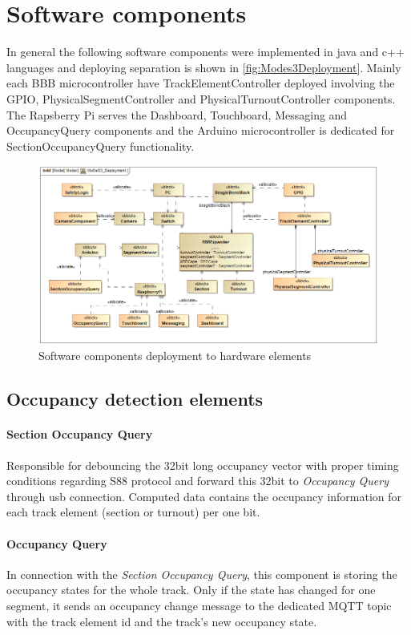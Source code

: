 \section{Software components}\label{section:CustomSW}
In general the following software components were implemented in java and c++ languages and deploying separation is shown in \autoref{fig:Modes3Deployment}. Mainly each BBB microcontroller have TrackElementController deployed involving the GPIO, PhysicalSegmentController and PhysicalTurnoutController components. The Rapsberry Pi serves the Dashboard, Touchboard, Messaging and OccupancyQuery components and the Arduino microcontroller is dedicated for SectionOccupancyQuery functionality.

\begin{figure}[h]
	\centering
	\includegraphics[width=150mm]{figures/modes3/MoDeS3_Deployment1.png}
	\caption{Software components deployment to hardware elements}
	\label{fig:Modes3Deployment}
\end{figure}

\subsection{Occupancy detection elements} \label{section:OccupancyDetection}
\paragraph{Section Occupancy Query}
Responsible for debouncing the 32bit long occupancy vector with proper timing conditions regarding S88 protocol and forward this 32bit to \textit{Occupancy Query} through usb connection. Computed data contains the occupancy information for each track element (section or turnout) per one bit.
\paragraph{Occupancy Query}
In connection with the \textit{Section Occupancy Query}, this component is storing the occupancy states for the whole track. Only if the state has changed for one segment, it sends an occupancy change message to the dedicated MQTT topic with the track element id and the track's new occupancy state.

